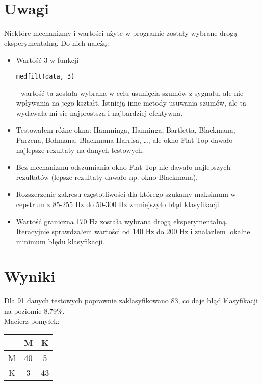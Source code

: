 \documentclass[11pt]{article}
\begin{document}
\section{Uwagi}
Niektóre mechanizmy i wartości użyte w programie zostały wybrane drogą eksperymentalną.
Do nich należą:
\begin{itemize}
    \item Wartość 3 w funkcji \begin{verbatim}medfilt(data, 3)\end{verbatim} - wartość ta została wybrana w celu usunięcia szumów z sygnału, ale nie wpływania na jego kształt. Istnieją inne metody usuwania szumów, ale ta wydawała mi się najprostsza i najbardziej efektywna.
    \item Testowałem różne okna: Hamminga, Hanninga, Bartletta, Blackmana, Parzena, Bohmana, Blackmana-Harrisa, …, ale okno Flat Top dawało najlepsze rezultaty na danych testowych.
    \item Bez mechanizmu odszumiania okno Flat Top nie dawało najlepszych rezultatów (lepsze rezultaty dawało np. okno Blackmana).
    \item Rozszerzenie zakresu częstotliwości dla którego szukamy maksimum w cepstrum z 85-255 Hz do 50-300 Hz zmniejszyło błąd klasyfikacji.
    \item Wartość graniczna 170 Hz została wybrana drogą eksperymentalną. Iteracyjnie sprawdzałem wartości od 140 Hz do 200 Hz i znalazłem lokalne minimum błędu klasyfikacji.
\end{itemize}
\section {Wyniki}
Dla 91 danych testowych poprawnie zaklasyfikowano 83, co daje błąd klasyfikacji na poziomie 8.79\%.\\
Macierz pomyłek:
\begin{center}
    \begin{tabular}{|c|c|c|}
        \hline
        & M & K \\
        \hline
        M & 40 & 5 \\
        \hline
        K & 3 & 43 \\
        \hline
    \end{tabular}
\end{center}
\end{document}
